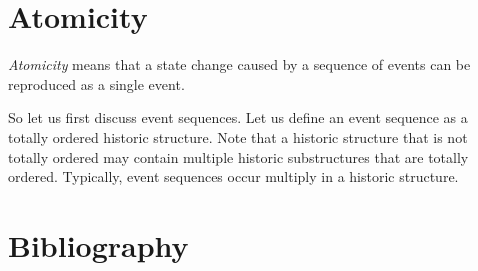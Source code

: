 \documentclass{elsarticle}
\begin{document}
\section{Atomicity}
\label{sct:Atomicity}
	{\em Atomicity} means that a state change caused by a sequence of events can be reproduced as a single event.

	So let us first discuss event sequences.
	Let us define an event sequence as a totally ordered historic structure.
	Note that a historic structure that is not totally ordered may contain multiple historic substructures
	that are totally ordered.
	Typically, event sequences occur multiply in a historic structure.


\section{Bibliography}


\end{document}

